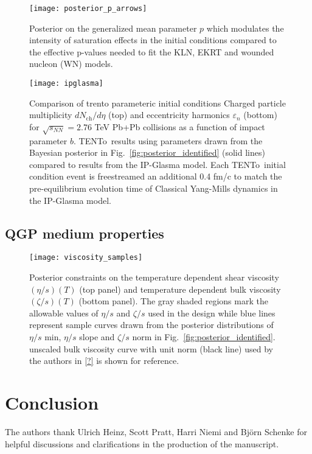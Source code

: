 \documentclass[aps,prc,reprint,amsmath,nofootinbib]{revtex4-1}
\newcommand{\trento}{T\raisebox{-0.5ex}{R}ENTo}
\newcommand{\nch}{N_\text{ch}}
\begin{document}
\begin{figure}
    \centering
    \texttt{[image: posterior\_p\_arrows]}
    \caption{Posterior on the generalized mean parameter $p$ which modulates the intensity of saturation effects in the initial conditions compared to the effective p-values needed to fit
    the KLN, EKRT and wounded nucleon (WN) models.}
    \label{posterior_p_arrows}
\end{figure}

\begin{figure}
    \centering
    \texttt{[image: ipglasma]}
    \caption{Comparison of trento parameteric initial conditions
    Charged particle multiplicity $d\nch/d\eta$ (top) and eccentricity harmonics $\varepsilon_n$ (bottom) for ${\sqrt{s_{NN}}=2.76}$ TeV Pb+Pb collisions as a function of impact parameter $b$. \protect\trento\ results using parameters drawn from the Bayesian posterior in Fig.~\ref{fig:posterior_identified} (solid lines) compared to results from the IP-Glasma model. Each \protect\trento\ initial condition event is freestreamed an additional 0.4 fm/c to match the pre-equilibrium evolution time of Classical Yang-Mills dynamics in the IP-Glasma model.}
\end{figure}

\subsection{QGP medium properties}
\begin{figure}
    \texttt{[image: viscosity\_samples]}
    \caption{Posterior constraints on the temperature dependent shear viscosity $(\eta/s)(T)$ (top panel) and temperature dependent bulk viscosity $(\zeta/s)(T)$ (bottom panel). The gray shaded regions mark the allowable values of $\eta/s$ and $\zeta/s$ used in the design while blue lines represent sample curves drawn from the posterior distributions of $\eta/s$ min, $\eta/s$ slope and $\zeta/s$ norm in Fig.~\ref{fig:posterior_identified}. unscaled bulk viscosity curve with unit norm (black line) used by the authors in \ref{?} is shown for reference.}
\end{figure}

\section{Conclusion}

\acknowledgements
The authors thank Ulrich Heinz, Scott Pratt, Harri Niemi and Bj\"orn Schenke for helpful discussions and clarifications in the production of the manuscript.
\appendix
\end{document}

